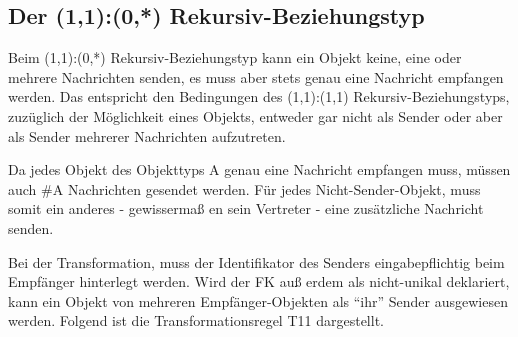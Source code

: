 \subsection{Der (1,1):(0,*) Rekursiv-Beziehungstyp}
Beim (1,1):(0,*) Rekursiv-Beziehungstyp kann ein Objekt keine, eine oder mehrere Nachrichten senden, es muss aber stets genau eine Nachricht empfangen werden. Das entspricht den Bedingungen des (1,1):(1,1) Rekursiv-Beziehungstyps, zuzüglich der Möglichkeit eines Objekts, entweder gar nicht als Sender oder aber als Sender mehrerer Nachrichten aufzutreten.

Da jedes Objekt des Objekttyps A genau eine Nachricht empfangen muss, müssen auch \#A Nachrichten gesendet werden. Für jedes Nicht-Sender-Objekt, muss somit ein anderes - gewissermaß en sein Vertreter - eine zusätzliche Nachricht senden.
\begin{center}
\end{center}
Bei der Transformation, muss der Identifikator des Senders eingabepflichtig beim Empfänger hinterlegt werden. Wird der FK auß erdem als nicht-unikal deklariert, kann ein Objekt von mehreren Empfänger-Objekten als \enquote{ihr} Sender ausgewiesen werden. Folgend ist die Transformationsregel T11 dargestellt.
\clearpage
